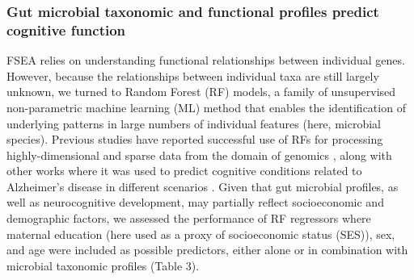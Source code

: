 \documentclass{article}
\providecommand{\DIFadd}[1]{{\protect\color{blue}\uwave{#1}}} %
\providecommand{\DIFaddbegin}{} %
\providecommand{\DIFaddend}{} %
\newcommand{\DIFaddincludegraphics}[2][]{{\color{blue}\fbox{\DIFOincludegraphics[#1]{#2}}}} %
\DeclareRobustCommand{\DIFaddbegin}{\DIFOaddbegin \let\includegraphics\DIFaddincludegraphics} %
\DeclareRobustCommand{\DIFaddend}{\DIFOaddend \let\includegraphics\DIFOincludegraphics} %
\begin{document}
\subsubsection*{Gut microbial taxonomic and functional profiles predict \DIFaddbegin \DIFadd{concurrently measured }\DIFaddend cognitive function}

FSEA relies on understanding functional relationships between individual
genes. However, because the relationships between individual taxa are
still largely unknown, we turned to Random Forest (RF) models, a family of 
unsupervised non-parametric machine learning (ML) method that enables
the identification of underlying patterns in large numbers of individual features
(here, microbial species).
Previous studies have reported
successful use of RFs for processing highly-dimensional and sparse data
from the domain of genomics
\cite{amaratungaEnrichedRandomForests2008,brieucPracticalIntroductionRandom2018,chenRandomForestsGenomic2012,franzosaGutMicrobiomeStructure2019,stephanRandomForestApproach2015},
along with other works where it was used
to predict cognitive conditions related to Alzheimer's disease in
different scenarios \cite{ardekaniPredictionIncipientAlzheimer2017,velazquezRandomForestModel2021}.
Given that gut microbial profiles, as well as neurocognitive
development, may partially reflect socioeconomic and demographic
factors, we assessed the performance of RF regressors where maternal
education (here used as a proxy of socioeconomic status (SES)),
sex, and age were included as possible predictors, either alone
or in combination with microbial taxonomic profiles (Table 3).
\end{document}
